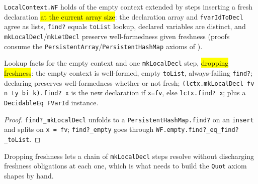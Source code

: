 \begin{definition}
\label{ind:lctx-wf}
\leanok
{} \texttt{LocalContext.WF} holds of the empty context extended by steps inserting a fresh declaration \hl{at the current array size}: the declaration array and \texttt{fvarIdToDecl} agree as lists, \texttt{find?} equals \texttt{toList} lookup, declared variables are distinct, and \texttt{mkLocalDecl}/\texttt{mkLetDecl} preserve well-formedness given freshness (proofs consume the \texttt{PersistentArray}/\texttt{PersistentHashMap} axioms of ).
\end{definition}

\begin{lemma}
\label{family:lctx-empty-decl}
\leanok
{} 

 Lookup facts for the empty context and one \texttt{mkLocalDecl} step, \hl{dropping freshness}: the empty context is well-formed, empty \texttt{toList}, always-failing \texttt{find?}; declaring preserves well-formedness whether or not fresh; \texttt{(lctx.mkLocalDecl fv n ty bi k).find? x} is the new declaration if \texttt{x=fv}, else \texttt{lctx.find? x}; plus a \texttt{DecidableEq FVarId} instance.
\end{lemma}
\begin{proof}
\leanok
{} \texttt{find?\_mkLocalDecl} unfolds to a \texttt{PersistentHashMap.find?} on an \texttt{insert} and splits on \texttt{x = fv}; \texttt{find?\_empty} goes through \texttt{WF.empty.find?\_eq\_find?\_toList}.
\end{proof}

\begin{remark}
 Dropping freshness lets a chain of \texttt{mkLocalDecl} steps resolve without discharging freshness obligations at each one, which is what  needs to build the \texttt{Quot} axiom shapes by hand.
\end{remark}

